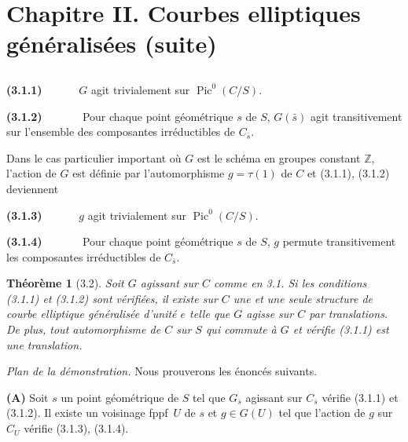 \documentclass[11pt,a4paper]{amsart}
\theoremstyle{plain}
\newtheorem{theorem}{Th\'eor\`eme}[section]
\theoremstyle{definition}
\DeclareMathOperator{\Pic}{Pic}
\newcommand{\ZZ}{\mathbb{Z}}
\newcommand{\fppf}{\textup{fppf}}
\begin{document}
\section*{Chapitre II. Courbes elliptiques g\'en\'eralis\'ees (suite)}

\setcounter{section}{3}
\setcounter{subsection}{1}

\subsection{}

\noindent\textbf{(3.1.1)} $\hspace{3em} G$ agit trivialement sur $\Pic^0(C/S)$.

\bigskip

\noindent\textbf{(3.1.2)} $\hspace{3em}$ Pour chaque point g\'eom\'etrique $s$ de $S$, $G(\bar{s})$ agit transitivement sur l'ensemble des composantes irr\'eductibles de $C_{\bar{s}}$.

\medskip

Dans le cas particulier important o\`u $G$ est le sch\'ema en groupes constant $\ZZ$, l'action de $G$ est d\'efinie par l'automorphisme $g = \tau(1)$ de $C$ et (3.1.1), (3.1.2) deviennent

\medskip

\noindent\textbf{(3.1.3)} $\hspace{3em} g$ agit trivialement sur $\Pic^0(C/S)$.

\bigskip

\noindent\textbf{(3.1.4)} $\hspace{3em}$ Pour chaque point g\'eom\'etrique $s$ de $S$, $g$ permute transitivement les composantes irr\'eductibles de $C_{\bar{s}}$.

\begin{theorem}[3.2]
Soit $G$ agissant sur $C$ comme en 3.1. Si les conditions (3.1.1) et (3.1.2) sont v\'erifi\'ees, il existe sur $C$ une et une seule structure de courbe elliptique g\'en\'eralis\'ee d'unit\'e $e$ telle que $G$ agisse sur $C$ par translations. De plus, tout automorphisme de $C$ sur $S$ qui commute \`a $G$ et v\'erifie (3.1.1) est une translation.
\end{theorem}

\noindent\textit{Plan de la d\'emonstration.} Nous prouverons les \'enonc\'es suivants.

\medskip

\noindent\textbf{(A)} Soit $s$ un point g\'eom\'etrique de $S$ tel que $G_{\bar{s}}$ agissant sur $C_{\bar{s}}$ v\'erifie (3.1.1) et (3.1.2). Il existe un voisinage \fppf\ $U$ de $s$ et $g \in G(U)$ tel que l'action de $g$ sur $C_U$ v\'erifie (3.1.3), (3.1.4).
\end{document}
